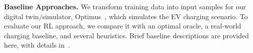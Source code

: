 
\noindent \textbf{Baseline Approaches.}
{\color{black} We transform training data into input samples for our digital twin/simulator, Optimus~\cite{JP2024}, which simulates the EV charging scenario. To evaluate our RL approach, we compare it with an optimal oracle, a real-world charging baseline, and several heuristics. Brief baseline descriptions are provided here, with details in~.}

